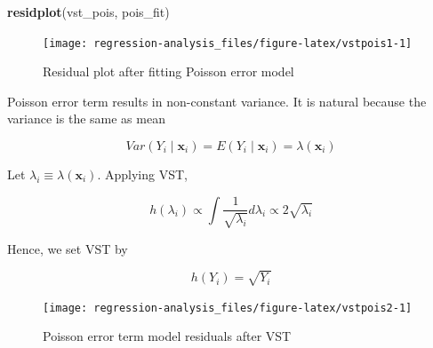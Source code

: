 \documentclass[]{book}
\newenvironment{Shaded}{\begin{snugshade}}{\end{snugshade}}
\newcommand{\CommentTok}[1]{\textcolor[rgb]{0.56,0.35,0.01}{\textit{#1}}}
\newcommand{\DataTypeTok}[1]{\textcolor[rgb]{0.13,0.29,0.53}{#1}}
\newcommand{\KeywordTok}[1]{\textcolor[rgb]{0.13,0.29,0.53}{\textbf{#1}}}
\newcommand{\NormalTok}[1]{#1}
\newcommand{\OperatorTok}[1]{\textcolor[rgb]{0.81,0.36,0.00}{\textbf{#1}}}
\newcommand{\StringTok}[1]{\textcolor[rgb]{0.31,0.60,0.02}{#1}}
\theoremstyle{definition}
\theoremstyle{definition}
\theoremstyle{definition}
\theoremstyle{remark}
\let\BeginKnitrBlock\begin \let\EndKnitrBlock\end
\begin{document}
\begin{Shaded}
\begin{Highlighting}[]
\KeywordTok{residplot}\NormalTok{(vst_pois, pois_fit)}
\end{Highlighting}
\end{Shaded}

\begin{figure}[H]

{\centering \texttt{[image: regression-analysis\_files/figure-latex/vstpois1-1]} 

}

\caption{Residual plot after fitting Poisson error model}\label{fig:vstpois1}
\end{figure}

\BeginKnitrBlock{solution}
{}Poisson error term results in non-constant variance. It is natural because the variance is the same as mean

\[Var(Y_i \mid \mathbf{x}_i) = E(Y_i \mid \mathbf{x}_i) = \lambda(\mathbf{x}_i)\]

Let \(\lambda_i \equiv \lambda(\mathbf{x}_i)\). Applying VST,

\[h(\lambda_i) \propto \int \frac{1}{\sqrt{\lambda_i}} d\lambda_i \propto 2 \sqrt{\lambda_i}\]

Hence, we set VST by

\[h(Y_i) = \sqrt{Y_i}\]
\EndKnitrBlock{solution}

\begin{Shaded}
\end{Shaded}

\begin{figure}[H]

{\centering \texttt{[image: regression-analysis\_files/figure-latex/vstpois2-1]} 

}

\caption{Poisson error term model residuals after VST}\label{fig:vstpois2}
\end{figure}
\end{document}
